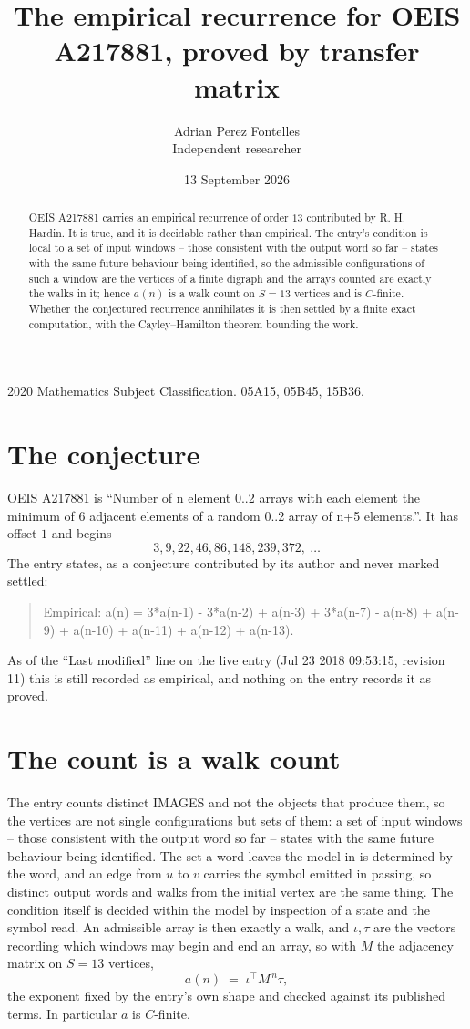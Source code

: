 \documentclass[11pt,a4paper]{article}
\title{The empirical recurrence for OEIS A217881, proved by transfer matrix}
\author{Adrian Perez Fontelles\\ \small Independent researcher}
\date{13 September 2026}
\theoremstyle{plain}
\theoremstyle{definition}
\begin{document}
\maketitle

\begin{abstract}
OEIS A217881 carries an empirical recurrence of order $13$ contributed by R. H. Hardin. It is
true, and it is decidable rather than empirical. The entry's condition is local to a set of input windows -- those consistent with the output word so far -- states with the same future behaviour being identified, so
the admissible configurations of such a window are the vertices of a finite digraph and the
arrays counted are exactly the walks in it; hence $a(n)$ is a walk count on $S=13$ vertices
and is $C$-finite. Whether the conjectured recurrence annihilates it is then settled by a
finite exact computation, with the Cayley--Hamilton theorem bounding the work.
\end{abstract}

\noindent\small 2020 Mathematics Subject Classification. 05A15, 05B45, 15B36.\normalsize

\section{The conjecture}

OEIS A217881 is ``Number of n element 0..2 arrays with each element the minimum of 6 adjacent elements of a random 0..2 array of n+5 elements.''. It has offset $1$ and begins
\[
3, 9, 22, 46, 86, 148, 239, 372,\ \dots
\]
The entry states, as a conjecture contributed by its author and never marked settled:
\begin{quote}
Empirical: a(n) = 3*a(n-1) - 3*a(n-2) + a(n-3) + 3*a(n-7) - a(n-8) + a(n-9) + a(n-10) + a(n-11) + a(n-12) + a(n-13).
\end{quote}
As of the ``Last modified'' line on the live entry (Jul 23 2018 09:53:15, revision 11) this is still
recorded as empirical, and nothing on the entry records it as proved.

\section{The count is a walk count}

The entry counts distinct IMAGES and not the objects that produce them, so the vertices are not single configurations but sets of them: a set of input windows -- those consistent with the output word so far -- states with the same future behaviour being identified. The set a word leaves the model in is determined by the word, and an edge from $u$ to $v$ carries the symbol emitted in passing, so distinct output words and walks from the initial vertex are the same thing. The condition itself is decided within the model by inspection of a state and the symbol read.
An admissible array is then exactly a walk, and $\iota,\tau$ are the vectors recording which windows may begin and end an array, so with $M$ the adjacency matrix on $S=13$ vertices,
\[
a(n)\;=\;\iota^{\!\top}M^{\,n}\tau ,
\]
the exponent fixed by the entry's own shape and checked against its published terms. In
particular $a$ is $C$-finite.
\end{document}
